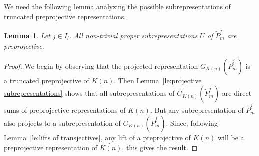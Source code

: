 \documentclass{amsart}
\newcommand{\sayD}[1]{\say[D]{#1}}
\newcommand{\sayT}[1]{\say[T]{#1}}
\newtheorem{lemma}[theorem]{Lemma}
\numberwithin{equation}{section}
\newcommand{\uj}{{\underline j}}
\newcommand\udim{{\underline{\dim}\, }}
\newcommand{\Ext}{\operatorname{Ext}}
\newcommand{\Hom}{\operatorname{Hom}}
\newcommand{\Sc}[2]{\langle #1,#2\rangle}
\begin{document}
We need the following lemma analyzing the possible subrepresentations of truncated preprojective representations.
\begin{lemma}
  \label{le:subrep}
  Let $\uj\in I_l$.
  All non-trivial proper subrepresentations $U$ of $\tilde P_m^{\uj}$ are preprojective.	
\end{lemma}
\begin{proof}
  We begin by observing that the projected representation $G_{K(n)}(\tilde P_m^{\uj})$ is a truncated preprojective of $K(n)$.
  Then Lemma~\ref{le:projective subrepresentations} shows that all subrepresentations of $G_{K(n)}(\tilde P_m^{\uj})$ are direct sums of preprojective representations of $K(n)$.
  But any subrepresentation of $\tilde P_m^{\uj}$ also projects to a subrepresentation of $G_{K(n)}(\tilde P_m^{\uj})$.
  Since, following Lemma~\ref{le:lifts of transjectives}, any lift of a preprojective of $K(n)$ will be a preprojective representation of $\widetilde{K(n)}$, this gives the result.
\end{proof}
\end{document}
